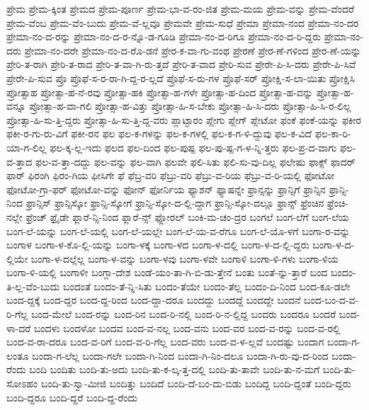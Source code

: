 {ಪ್ರೇಮ
ಪ್ರೇಮ-ಕ್ಕಿಂತ
ಪ್ರೇಮದ
ಪ್ರೇಮ-ಪೂರ್ಣ
ಪ್ರೇಮ-ಭಾ-ವ-ರಂ-ಜಿತ
ಪ್ರೇಮ-ಮಯ
ಪ್ರೇಮ-ವನ್ನು
ಪ್ರೇಮ-ವೆಂದರೆ
ಪ್ರೇಮ-ವೆಂಬ
ಪ್ರೇಮ-ವೆಂ-ಬುದು
ಪ್ರೇಮ-ವೆ-ಲ್ಲವೂ
ಪ್ರೇಮವೇ
ಪ್ರೇಮ-ಸುಧೆ
ಪ್ರೇಮಾ
ಪ್ರೇಮಾ-ನಂದ
ಪ್ರೇಮಾ-ನಂ-ದರ
ಪ್ರೇಮಾ-ನಂ-ದ-ರನ್ನು
ಪ್ರೇಮಾ-ನಂ-ದ-ರ-ನ್ನೊ-ಡ-ಗೂಡಿ
ಪ್ರೇಮಾ-ನಂ-ದ-ರಿಗೂ
ಪ್ರೇಮಾ-ನಂ-ದ-ರಿ-ದ್ದರು
ಪ್ರೇಮಾ-ನಂ-ದರು
ಪ್ರೇಮಾ-ನಂ-ದರೇ
ಪ್ರೇಮಾ-ನಂ-ದ-ರೊ-ಡನೆ
ಪ್ರೇರ-ಕ-ವಾ-ಗು-ವಂಥ
ಪ್ರೇರಣೆ
ಪ್ರೇರ-ಣೆ-ಗಳಿಂದ
ಪ್ರೇರ-ಣೆ-ಯನ್ನು
ಪ್ರೇರಿ-ತ-ರಾಗಿ
ಪ್ರೇರಿ-ತ-ರಾದ
ಪ್ರೇರಿ-ತ-ವಾ-ಗಿ-ರು-ತ್ತದೆ
ಪ್ರೇರಿ-ತ-ವಾದ
ಪ್ರೇರಿ-ಸುವ
ಪ್ರೇರೇ-ಪಿ-ಸಿ-ದರು
ಪ್ರೇರೇ-ಪಿ-ಸಿವೆ
ಪ್ರೇರೇ-ಪಿ-ಸುವ
ಪ್ರೊ
ಪ್ರೊಫೆ-ಸ-ರ-ರಾ-ಗಿ-ದ್ದ-ರ-ಲ್ಲದೆ
ಪ್ರೊಫೆ-ಸ-ರು-ಗಳ
ಪ್ರೊಫೆ-ಸರ್
ಪ್ರೋಕ್ಷಿ-ಸ-ಲಾ-ಯಿತು
ಪ್ರೋಕ್ಷಿಸಿ
ಪ್ರೋತ್ಸಾಹ
ಪ್ರೋತ್ಸಾ-ಹ-ನೆ-ರವು
ಪ್ರೋತ್ಸಾ-ಹಕಿ
ಪ್ರೋತ್ಸಾ-ಹ-ಗಳೇ
ಪ್ರೋತ್ಸಾ-ಹ-ದಿಂದ
ಪ್ರೋತ್ಸಾ-ಹ-ವನ್ನು
ಪ್ರೋತ್ಸಾ-ಹ-ವನ್ನೂ
ಪ್ರೋತ್ಸಾ-ಹ-ವಾ-ಗಲಿ
ಪ್ರೋತ್ಸಾ-ಹ-ವಿತ್ತು
ಪ್ರೋತ್ಸಾ-ಹಿ-ಸ-ಬೇಕು
ಪ್ರೋತ್ಸಾ-ಹಿ-ಸಿ-ದರು
ಪ್ರೋತ್ಸಾ-ಹಿ-ಸಿ-ರ-ಲಿಲ್ಲ
ಪ್ರೋತ್ಸಾ-ಹಿ-ಸು-ತ್ತಿ-ದ್ದರು
ಪ್ರೋತ್ಸಾ-ಹಿ-ಸು-ತ್ತಿ-ದ್ದ-ವರು
ಪ್ಲಾಟ್ಫಾರಂ
ಪ್ಲೇಗು
ಪ್ಲೇಗ್
ಪ್ಲೇಟೋ
ಫಂಕೆ
ಫಂಕೆ-ಯನ್ನು
ಫಕೀರ
ಫಕೀ-ರ-ಗು-ರು-ವಿಗೆ
ಫಕೀ-ರನ
ಫಲ
ಫಲ-ಕ-ಗಳನ್ನು
ಫಲ-ಕ-ಗಳಲ್ಲಿ
ಫಲ-ಕ-ಗ-ಳಿ-ದ್ದುವು
ಫಲ-ಕ-ವಿದೆ
ಫಲ-ಕಾ-ರಿ-ಯಾ-ಗ-ಲಿಲ್ಲ
ಫಲ-ಕ್ಕ-ಲ್ಲ-ಇದು
ಫಲದ
ಫಲ-ದಿಂದ
ಫಲ-ಪುಷ್ಪ
ಫಲ-ಪು-ಷ್ಪ-ಗ-ಳ-ನ್ನಿ-ತ್ತರು
ಫಲ-ಪ್ರ-ದ-ವಾಗು
ಫಲ-ವ-ತ್ತಾದ
ಫಲ-ವ-ತ್ತಾ-ದದ್ದು
ಫಲ-ವನ್ನು
ಫಲ-ವಾಗಿ
ಫಲವೇ
ಫಲಿ-ಸಿತು
ಫಲಿ-ಸು-ವು-ದಿಲ್ಲ
ಫಲೇಷು
ಫಾಕ್ಸ್
ಫಾದರ್
ಫಾರ್
ಫಿರಂಗಿ
ಫಿರಂ-ಗಿಯ
ಫೀಸಿಗೇ
ಫೆ
ಫೆಬ್ರ-ವರಿ
ಫೆಬ್ರು-ವರಿ
ಫೆಬ್ರು-ವ-ರಿಯ
ಫೆಬ್ರು-ವ-ರಿ-ಯಲ್ಲಿ
ಫೋಟೋ
ಫೋಟೋ-ಗ್ರಾ-ಫರ್
ಫೋಟೋ-ವನ್ನು
ಫೋನ್
ಫೋರ್ನಿಯ
ಫ್ಯಾಶನ್
ಫ್ಯಾಷನ್ನೇ
ಫ್ರಾನ್ಸನ್ನು
ಫ್ರಾನ್ಸಿಗೆ
ಫ್ರಾನ್ಸಿನ
ಫ್ರಾನ್ಸಿ-ನಿಂದ
ಫ್ರಾನ್ಸಿಸ್
ಫ್ರಾನ್ಸಿಸ್ಕೋ
ಫ್ರಾನ್ಸಿ-ಸ್ಕೋಗೆ
ಫ್ರಾನ್ಸಿ-ಸ್ಕೋ-ದ-ಲ್ಲಿ-ದ್ದಾಗ
ಫ್ರಾನ್ಸಿ-ಸ್ಕೋ-ದಲ್ಲೂ
ಫ್ರಾನ್ಸ್
ಫ್ರೆಂಚಿನ
ಫ್ರೆಂಚಿ-ನಲ್ಲೇ
ಫ್ರೆಂಚ್
ಫ್ರೈಡೇ
ಫ್ಲಾರೆ-ನ್ಸಿ-ನಿಂದ
ಫ್ಲಾರೆ-ನ್ಸ್
ಫ್ಲೋರಲ್
ಬಂಕಿ-ಮ-ಚಂ-ದ್ರರ
ಬಂಗಲೆ
ಬಂಗ-ಲೆಗೆ
ಬಂಗ-ಲೆಯ
ಬಂಗ-ಲೆ-ಯನ್ನು
ಬಂಗ-ಲೆ-ಯಲ್ಲಿ
ಬಂಗ-ಲೆ-ಯಲ್ಲೇ
ಬಂಗ-ಲೆ-ಯ-ವ-ರೆಗೂ
ಬಂಗ-ಲೆ-ಯೊ-ಳಗೆ
ಬಂಗಾ-ರ-ವನ್ನು
ಬಂಗಾಳ
ಬಂಗಾ-ಳ-ಕೊ-ಲ್ಲಿ-ಯನ್ನು
ಬಂಗಾ-ಳಕ್ಕೆ
ಬಂಗಾ-ಳದ
ಬಂಗಾ-ಳ-ದಲ್ಲಿ
ಬಂಗಾ-ಳ-ದ-ಲ್ಲಿ-ದ್ದರು
ಬಂಗಾ-ಳ-ದ-ಲ್ಲಿಯೇ
ಬಂಗಾ-ಳ-ದಲ್ಲೆಲ್ಲ
ಬಂಗಾ-ಳ-ವನ್ನು
ಬಂಗಾ-ಳವು
ಬಂಗಾ-ಳವೇ
ಬಂಗಾಳಿ
ಬಂಗಾ-ಳಿ-ಗಳು
ಬಂಗಾ-ಳಿಯ
ಬಂಗಾ-ಳಿ-ಯಲ್ಲಿ
ಬಂಗಾಳೀ
ಬಂಗ್ಲಾ-ದೇಶ
ಬಂಡೆ-ಯಂ-ತಾ-ಗಿ-ಬಿ-ಡು-ತ್ತೇನೆ
ಬಂತು
ಬಂತೆ-ನ್ನು-ತ್ತಾರೆ
ಬಂದ
ಬಂದಂ-ತಿ-ಲ್ಲ-ವೆಂ-ಬುದು
ಬಂದಂತೆ
ಬಂದಂ-ತೆ-ನ್ನಿ-ಸಿತು
ಬಂದಂ-ತೆಯೇ
ಬಂದಂ-ತೆಲ್ಲ
ಬಂದಂ-ದಿ-ನಿಂದ
ಬಂದ-ಕೂ-ಡಲೇ
ಬಂದ-ದ್ದಕ್ಕೆ
ಬಂದ-ದ್ದರ
ಬಂದ-ದ್ದ-ರಿಂದ
ಬಂದ-ದ್ದಾ-ದರೂ
ಬಂದದ್ದು
ಬಂದದ್ದೆ
ಬಂದದ್ದೇ
ಬಂದನೆ
ಬಂದ-ಬಂ-ದ-ವ-ರಿ-ಗೆಲ್ಲ
ಬಂದ-ಮೇಲೆ
ಬಂದ-ರನ್ನು
ಬಂದ-ರಿನ
ಬಂದ-ರಿ-ನಲ್ಲಿ
ಬಂದ-ರಿ-ನ-ಲ್ಲಿದ್ದ
ಬಂದರು
ಬಂದರೂ
ಬಂದರೆ
ಬಂದ-ಳಾ-ದರೆ
ಬಂದಳು
ಬಂದಳೋ
ಬಂದವ
ಬಂದ-ವ-ನಲ್ಲ
ಬಂದ-ವನು
ಬಂದ-ವರ
ಬಂದ-ವ-ರನ್ನು
ಬಂದ-ವ-ರಲ್ಲಿ
ಬಂದ-ವ-ರಾ-ದರೂ
ಬಂದ-ವ-ರಿಗೆ
ಬಂದ-ವ-ರಿ-ಗೆಲ್ಲ
ಬಂದ-ವರು
ಬಂದ-ವ-ಳ-ಲ್ಲವೆ
ಬಂದಷ್ಟು
ಬಂದಾಗ
ಬಂದಾ-ಗ-ಲಂತೂ
ಬಂದಾ-ಗ-ಲೆಲ್ಲ
ಬಂದಾ-ಗಲೇ
ಬಂದಾ-ಗಿ-ನಿಂದ
ಬಂದಾ-ಗಿ-ನಿಂ-ದಲೂ
ಬಂದಾ-ಗಿ-ರು-ವು-ದ-ರಿಂದ
ಬಂದಾ-ರೆಂದು
ಬಂದಿ
ಬಂದಿತು
ಬಂದಿ-ತು-ಅದು
ಬಂದಿ-ತು-ಕ-ಲ್ಕ-ತ್ತ-ದಲ್ಲಿ
ಬಂದಿ-ತು-ತಾವೇ
ಬಂದಿ-ತು-ನ-ಮಗೆ
ಬಂದಿ-ತು-ಸೋಽಹಂ
ಬಂದಿ-ತು-ಸ್ವಾ-ಮೀಜಿ
ಬಂದಿತ್ತು
ಬಂದಿದೆ
ಬಂದಿ-ದೆ-ಬಂ-ದು-ಬಿಡು
ಬಂದಿದ್ದ
ಬಂದಿ-ದ್ದಂತೆ
ಬಂದಿ-ದ್ದರು
ಬಂದಿ-ದ್ದರೂ
ಬಂದಿ-ದ್ದರೆ
ಬಂದಿ-ದ್ದ-ರೆಂದು
}
